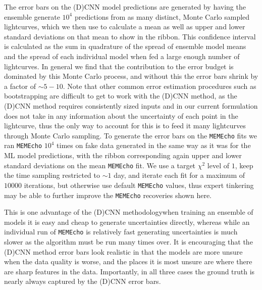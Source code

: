 \documentclass[floatfix,twocolumn,trackchanges,linenumbers]{aastex7}
\begin{document}
The error bars on the (D)CNN model predictions are generated by having the ensemble generate $10^4$ predictions from as many distinct, Monte Carlo sampled lightcurves, which we then use to calculate a mean as well as upper and lower standard deviations on that mean to show in the ribbon. This confidence interval is calculated as the sum in quadrature of the spread of ensemble model means and the spread of each individual model when fed a large enough number of lightcurves. In general we find that the contribution to the error budget is dominated by this Monte Carlo process, and without this the error bars shrink by a factor of $\sim 5-10$. Note that other common error estimation procedures such as bootstrapping are difficult to get to work with the (D)CNN method, as the (D)CNN method requires consistently sized inputs and in our current formulation does not take in any information about the uncertainty of each point in the lightcurve, thus the only way to account for this is to feed it many lightcurves through Monte Carlo sampling. To generate the error bars on the \texttt{MEMEcho} fits we ran \texttt{MEMEcho} $10^4$ times on fake data generated in the same way as it was for the ML model predictions, with the ribbon corresponding again upper and lower standard deviations on the mean \texttt{MEMEcho} fit. We use a target $\chi^2$ level of $1$, keep the time sampling restricted to $\sim 1$ day, and iterate each fit for a maximum of $10000$ iterations, but otherwise use default \texttt{MEMEcho} values, thus expert tinkering may be able to further improve the \texttt{MEMEcho} recoveries shown here.

This is one advantage of the (D)CNN methodology\textemdash when training an ensemble of models it is easy and cheap to generate uncertainties directly, whereas while an individual run of \texttt{MEMEcho} is relatively fast generating uncertainties is much slower as the algorithm must be run many times over. It is encouraging that the (D)CNN method error bars look realistic in that the models are more unsure when the data quality is worse, and the places it is most unsure are where there are sharp features in the data. Importantly, in all three cases the ground truth is nearly always captured by the (D)CNN error bars. 
\end{document}
